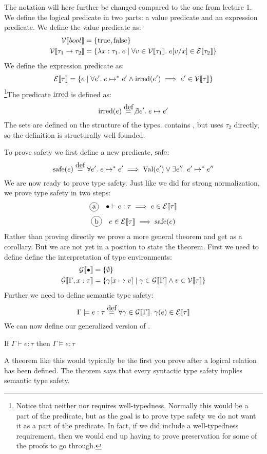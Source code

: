 The notation will here further be changed compared to the one from lecture 1. We define the logical predicate in two parts: a value predicate and an expression predicate. We define the value predicate as:
\begin{align*}
  \mathcal{V}\llbracket bool \rrbracket & = \{ \text{true}, \text{false} \}\\
  \mathcal{V}\llbracket  \tau_1 \rightarrow \tau_2 \rrbracket & = \{\lambda x : \tau_1 . \; e \; | \; \forall v \in \mathcal{V}\llbracket \tau_1 \rrbracket.\; e [v/x] \in \mathcal{E}\llbracket \tau_2 \rrbracket\}
\end{align*}
We define the expression predicate as:
\[
  \mathcal{E}\llbracket \tau \rrbracket = \{e \; | \; \forall e'. \; e \mapsto^{*} e' \wedge \operatorname{irred}(e') \implies e' \in \mathcal{V}\llbracket \tau \rrbracket \}
\]
\footnote{Notice that neither \vpred{\tau} nor \epred{\tau} requires well-typedness. Normally this would be a part of the predicate, but as the goal is to prove type safety we do not want it as a part of the predicate. In fact, if we did include a well-typedness requirement, then we would end up having to prove preservation for some of the proofs to go through.}The predicate $\operatorname{irred}$ is defined as:
\[
  \irred(e) \eqdef \not\exists e'. \; e \evalto e'
\]
The sets are defined on the structure of the types.  contains , but  uses $\tau_2$ directly, so the definition is structurally well-founded. 

To prove safety we first define a new predicate, $\operatorname{safe}$:
\[
  \safe(e) \eqdef \forall e' . \; e \evaltos e' \implies \val(e') \vee \exists e
''. \; e' \evaltos e''
\]
We are now ready to prove type safety. Just like we did for strong normalization, we prove type safety in two steps:
\[
  \circled{a} \quad \mtenv \vdash e : \tau \implies e \in \epred{\tau}
\]
\[
  \circled{b} \quad e \in \epred{\tau} \implies \safe(e)
\]
Rather than proving  directly we prove a more general theorem and get  as a corollary. But we are not yet in a position to state the theorem. First we need to define define the interpretation of type environments:
\begin{align*}
  \mathcal{G}\llbracket \bullet \rrbracket & = \{ \emptyset \} \\
  \mathcal{G}\llbracket \Gamma,x:\tau \rrbracket & = \{\gamma[x \mapsto v] \; | \; 
    \gamma \in \mathcal{G}\llbracket \Gamma \rrbracket \wedge 
    v \in \mathcal{V}\llbracket \tau \rrbracket\}
\end{align*}
Further we need to define semantic type safety:
\[
  \Gamma \models e : \tau \eqdef \forall \gamma \in \gpred{\Gamma} . \; \gamma(e) \in \epred{\tau}
\]
We can now define our generalized version of . 
\begin{btypesafety}
  If $\Gamma \vdash e : \tau$ then $\Gamma \models e : \tau$
\end{btypesafety}
A theorem like this would typically be the first you prove after a logical relation has been defined. The theorem says that every syntactic type safety implies semantic type safety. 

